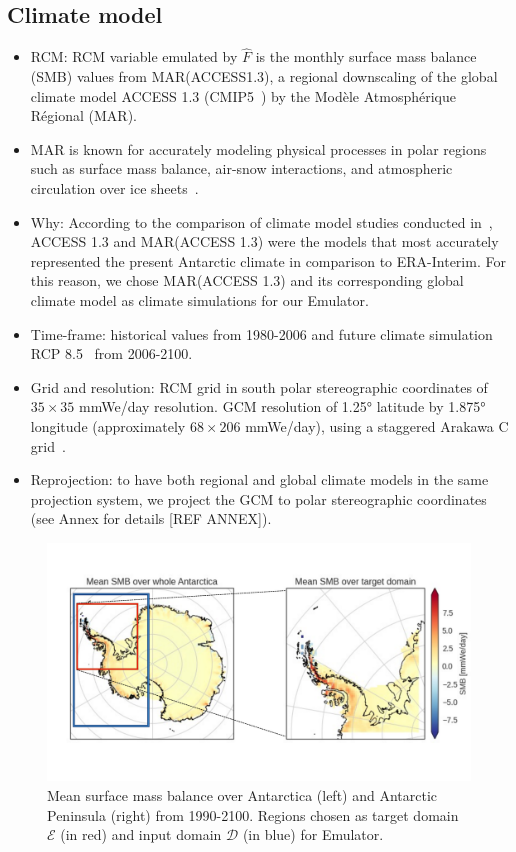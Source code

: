 \documentclass[a4paper,11pt,oneside]{report}
\begin{document}
\subsection{Climate model}
\begin{itemize}
   \item RCM: RCM variable emulated by $\hat{F}$ is the monthly surface mass balance (SMB) values from MAR(ACCESS1.3), a regional downscaling of the global climate model ACCESS 1.3 (CMIP5~\cite{ACCESS13, CMIP5}) by the Modèle Atmosphérique Régional (MAR). 
    \item MAR is known for accurately modeling physical processes in polar regions such as surface mass balance, air-snow interactions, and atmospheric circulation over ice sheets~\cite{MAR}. 
    \item Why: According to the comparison of climate model studies conducted in~\cite{Kittel, Agosta2015}, ACCESS 1.3 and MAR(ACCESS 1.3) were the models that most accurately represented the present Antarctic climate in comparison to ERA-Interim. For this reason, we chose MAR(ACCESS 1.3) and its corresponding global climate model as climate simulations for our Emulator.  
    \item Time-frame: historical values from 1980-2006 and future climate simulation RCP 8.5~\cite{Moss2010} from 2006-2100. 
    \item Grid and resolution: RCM grid in south polar stereographic coordinates of $35 \times 35$ \si{mmWe/day} resolution. GCM resolution of 1.25° latitude by 1.875° longitude (approximately $68 \times 206$ \si{mmWe/day}), using a staggered Arakawa C grid~\cite{ACCESS13, ACCESS13_2}. 
    \item Reprojection: to have both regional and global climate models in the same projection system, we project the GCM to polar stereographic coordinates (see Annex for details [REF ANNEX]). 
\end{itemize}

\begin{figure}[!t]
  \centering
  \includegraphics[width=\columnwidth]{images/domains.pdf}
  \caption []{\small Mean surface mass balance over Antarctica (left) and Antarctic Peninsula (right) from 1990-2100. Regions chosen as target domain $\mathcal{E}$ (in red) and input domain $\mathcal{D}$ (in blue) for Emulator.}
  \vspace{-3mm}
    \label{fig:region-of-choice}
\end{figure}
\end{document}
